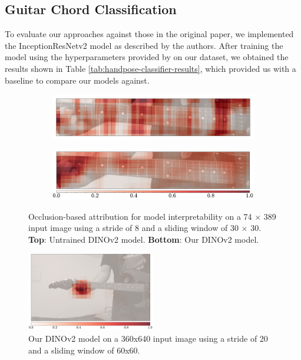 \documentclass[10pt,twocolumn,letterpaper]{article}
\begin{document}
\subsection{Guitar Chord Classification}
To evaluate our approaches against those in the original paper, we implemented the InceptionResNetv2 model as described by the authors. After training the model using the hyperparameters provided by \cite{Kristian_Zaman_Tenoyo_Jodhinata_2024} on our dataset, we obtained the results shown in Table \ref{tab:handpose-classifier-results}, which provided us with a baseline to compare our models against.

\begin{figure}[h]
    \centering
    \begin{subfigure}[t]{0.5\textwidth}
        \centering
        \includegraphics[width=\textwidth]{images/final/occlusion_untrained.pdf}
    \end{subfigure}
    \begin{subfigure}[t]{0.5\textwidth}
        \centering
        \includegraphics[width=\textwidth]{images/final/occlusion_trained.pdf}
    \end{subfigure}
    \caption{Occlusion-based attribution \cite{kokhlikyan2020captum} for model interpretability on a 74 $\times$ 389 input image using a stride of 8 and a sliding window of 30 $\times$ 30. \textbf{Top}: Untrained DINOv2 model. \textbf{Bottom}: Our DINOv2 model.}
    \label{fig:chord-classifier-visualization-fretboard}
\end{figure}

\begin{figure}[h]
    \centering
    \includegraphics[width=0.5\textwidth]{images/final/occlusion_trained_full.pdf}
    \caption{Our DINOv2 model on a 360x640 input image using a stride of 20 and a sliding window of 60x60.}
    \label{fig:chord-classifier-visualization-fretboard-2}
\end{figure}
\end{document}
